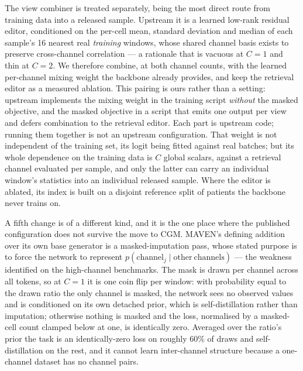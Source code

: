 \documentclass[journal]{IEEEtran}
\begin{document}
The view combiner is treated separately, being the most direct route from training data into
a released sample. Upstream it is a learned low-rank residual editor, conditioned on the
per-cell mean, standard deviation and median of each sample's 16 nearest real \emph{training}
windows, whose shared channel basis exists to preserve cross-channel correlation --- a
rationale that is vacuous at $C=1$ and thin at $C=2$. We therefore combine, at both channel
counts, with the learned per-channel mixing weight the backbone already provides, and keep
the retrieval editor as a measured ablation. This pairing is ours rather than a setting:
upstream implements the mixing weight in the training script \emph{without} the masked
objective, and the masked objective in a script that emits one output per view and defers
combination to the retrieval editor. Each part is upstream code; running them together is
not an upstream configuration. That weight is not independent of the training
set, its logit being fitted against real batches; but its whole dependence on the training
data is $C$ global scalars, against a retrieval channel evaluated per sample, and only the
latter can carry an individual window's statistics into an individual released sample. Where
the editor is ablated, its index is built on a disjoint reference split of patients the
backbone never trains on.

A fifth change is of a different kind, and it is the one place where the published
configuration does not survive the move to CGM. MAVEN's defining addition over its own base
generator is a masked-imputation pass, whose stated purpose is to force the network to
represent $p(\mathrm{channel}_j\mid\mathrm{other\ channels})$ --- the weakness identified on
the high-channel benchmarks. The mask is drawn per channel across all tokens, so at $C=1$ it
is one coin flip per window: with probability equal to the drawn ratio the only channel is
masked, the network sees no observed values and is conditioned on its own detached prior,
which is self-distillation rather than imputation; otherwise nothing is masked and the loss,
normalised by a masked-cell count clamped below at one, is identically zero. Averaged over
the ratio's prior the task is an identically-zero loss on roughly 60\% of draws and
self-distillation on the rest, and it cannot learn inter-channel structure because a
one-channel dataset has no channel pairs.
\end{document}
